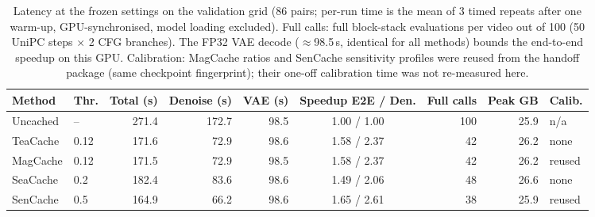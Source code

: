 \begin{table}[htbp]\centering\small\setlength{\tabcolsep}{4pt}
\begin{tabular}{@{}llrrrcrrl@{}}\toprule
Method & Thr. & Total (s) & Denoise (s) & VAE (s) & Speedup E2E / Den. & Full calls & Peak GB & Calib.\\\midrule
Uncached & -- & 271.4 & 172.7 & 98.5 & 1.00 / 1.00 & 100 & 25.9 & n/a \\
TeaCache & 0.12 & 171.6 & 72.9 & 98.6 & 1.58 / 2.37 & 42 & 26.2 & none \\
MagCache & 0.12 & 171.5 & 72.9 & 98.5 & 1.58 / 2.37 & 42 & 26.2 & reused \\
SeaCache & 0.2 & 182.4 & 83.6 & 98.6 & 1.49 / 2.06 & 48 & 26.6 & none \\
SenCache & 0.5 & 164.9 & 66.2 & 98.6 & 1.65 / 2.61 & 38 & 25.9 & reused \\
\bottomrule\end{tabular}
\caption{Latency at the frozen settings on the validation grid (86 pairs; per-run time is the mean of 3 timed repeats after
one warm-up, GPU-synchronised, model loading excluded). Full calls: full block-stack evaluations per video out of 100
(50 UniPC steps $\times$ 2 CFG branches). The FP32 VAE decode ($\approx$98.5\,s, identical for all methods) bounds the
end-to-end speedup on this GPU. Calibration: MagCache ratios and SenCache sensitivity profiles were reused from the
handoff package (same checkpoint fingerprint); their one-off calibration time was not re-measured here.}
\label{tab:efficiency}\end{table}
